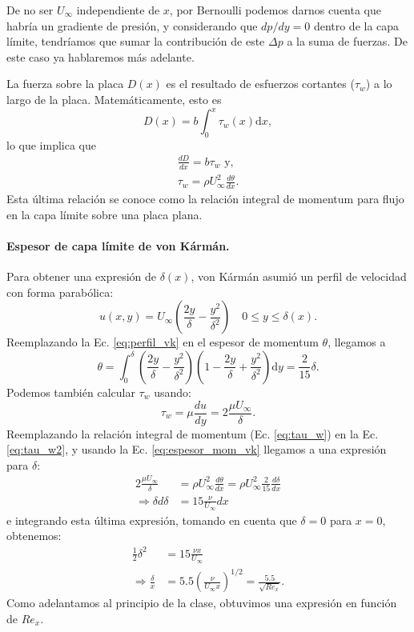 De no ser $U_\infty$  independiente de $x$, por Bernoulli podemos darnos cuenta que habría un gradiente de presión, y considerando que $dp/dy=0$ dentro de la capa límite, tendríamos que sumar la contribución de este $\Delta p$ a la suma de fuerzas.
De este caso ya hablaremos más adelante.

La fuerza sobre la placa $D(x)$ es el resultado de esfuerzos cortantes ($\tau_w$) a lo largo de la placa.
Matemáticamente, esto es
%
\begin{equation}
D(x) = b\int_0^x \tau_w(x)\mathrm{d}x,
\end{equation}
%
lo que implica que
%
\begin{align}\label{eq:tau_w}
\frac{dD}{dx}=b\tau_w \text{ y, }\nonumber\\
\tau_w=\rho U_\infty^2 \frac{d\theta}{dx}.
\end{align}
%
Esta última relación se conoce como la relación integral de momentum para flujo en la capa límite sobre una placa plana.

\paragraph*{Espesor de capa límite de von Kármán.}
Para obtener una expresión de $\delta(x)$, von Kármán asumió un perfil de velocidad con forma parabólica:
%
\begin{equation}\label{eq:perfil_vk}
u(x,y) = U_\infty\left(\frac{2y}{\delta}-\frac{y^2}{\delta^2}\right) \quad 0\leq y\leq \delta(x).
\end{equation}
%
Reemplazando la Ec. \eqref{eq:perfil_vk} en el espesor de momentum $\theta$, llegamos a
%
\begin{equation}\label{eq:espesor_mom_vk}
\theta = \int_0^\delta \left(\frac{2y}{\delta} - \frac{y^2}{\delta^2}\right)\left(1-\frac{2y}{\delta} + \frac{y^2}{\delta^2}\right)\mathrm{d}y=\frac{2}{15}\delta.
\end{equation}
%
Podemos también calcular $\tau_w$ usando:
%
\begin{equation}\label{eq:tau_w2}
\tau_w = \mu\frac{du}{dy} = 2\frac{\mu U_\infty}{\delta}.
\end{equation}
%
Reemplazando la relación integral de momentum (Ec. \eqref{eq:tau_w}) en la Ec. \eqref{eq:tau_w2}, y usando la Ec. \eqref{eq:espesor_mom_vk} llegamos a una expresión para $\delta$:
%
\begin{align}
2\frac{\mu U_\infty}{\delta} &= \rho U_\infty^2 \frac{d\theta}{dx} = \rho U_\infty^2 \frac{2}{15}\frac{d\delta}{dx}\nonumber\\
\Rightarrow \delta d\delta &= 15\frac{\nu}{U_\infty}dx
\end{align}
% 
e integrando esta última expresión, tomando en cuenta que $\delta=0$ para $x=0$, obtenemos:
%
\begin{align}\label{eq:delta_vk}
\frac{1}{2}\delta^2 &= 15 \frac{\nu x}{U_\infty} \nonumber\\
\Rightarrow \frac{\delta}{x} &= 5.5\left(\frac{\nu}{U_\infty x}\right)^{1/2} = \frac{5.5}{\sqrt{Re_x}}.
\end{align}
%
Como adelantamos al principio de la clase, obtuvimos una expresión en función de $Re_x$.

